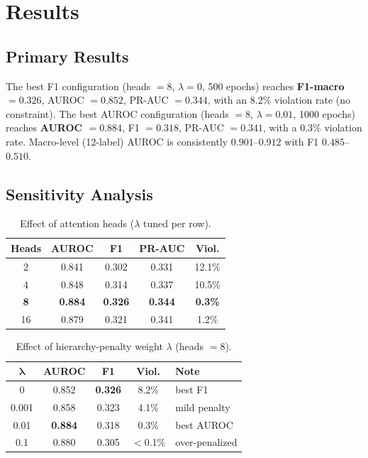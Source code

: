 \documentclass[10pt,twocolumn]{article}
\begin{document}
\section{Results}

\subsection{Primary Results}
The best F1 configuration (heads $=8$, $\lambda=0$, 500 epochs) reaches \textbf{F1-macro $=0.326$}, AUROC $=0.852$, PR-AUC $=0.344$, with an $8.2\%$ violation rate (no constraint). The best AUROC configuration (heads $=8$, $\lambda=0.01$, 1000 epochs) reaches \textbf{AUROC $=0.884$}, F1 $=0.318$, PR-AUC $=0.341$, with a $0.3\%$ violation rate. Macro-level (12-label) AUROC is consistently $0.901$--$0.912$ with F1 $0.485$--$0.510$.

\subsection{Sensitivity Analysis}

\begin{table}[t]
\centering\small
\caption{Effect of attention heads ($\lambda$ tuned per row).}
\label{tab:heads}
\begin{tabular}{ccccc}
\toprule
\textbf{Heads} & \textbf{AUROC} & \textbf{F1} & \textbf{PR-AUC} & \textbf{Viol.} \\
\midrule
2  & 0.841 & 0.302 & 0.331 & 12.1\% \\
4  & 0.848 & 0.314 & 0.337 & 10.5\% \\
\textbf{8}  & \textbf{0.884} & \textbf{0.326} & \textbf{0.344} & \textbf{0.3\%} \\
16 & 0.879 & 0.321 & 0.341 & 1.2\% \\
\bottomrule
\end{tabular}
\end{table}

\begin{table}[t]
\centering\small
\caption{Effect of hierarchy-penalty weight $\lambda$ (heads $=8$).}
\label{tab:lambda}
\begin{tabular}{ccccl}
\toprule
$\boldsymbol{\lambda}$ & \textbf{AUROC} & \textbf{F1} & \textbf{Viol.} & \textbf{Note} \\
\midrule
0      & 0.852 & \textbf{0.326} & 8.2\%  & best F1 \\
0.001  & 0.858 & 0.323 & 4.1\%  & mild penalty \\
0.01   & \textbf{0.884} & 0.318 & 0.3\%  & best AUROC \\
0.1    & 0.880 & 0.305 & $<$0.1\% & over-penalized \\
\bottomrule
\end{tabular}
\end{table}
\end{document}
